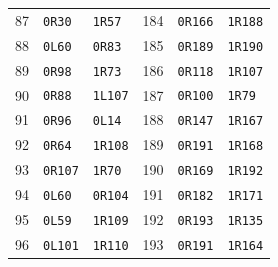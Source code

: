 \begin{longtable}{@{}rll@{\hspace{2em}}rll@{}}
87 & \texttt{0R30} & \texttt{1R57} & 184 & \texttt{0R166} & \texttt{1R188}\\
88 & \texttt{0L60} & \texttt{0R83} & 185 & \texttt{0R189} & \texttt{1R190}\\
89 & \texttt{0R98} & \texttt{1R73} & 186 & \texttt{0R118} & \texttt{1R107}\\
90 & \texttt{0R88} & \texttt{1L107} & 187 & \texttt{0R100} & \texttt{1R79}\\
91 & \texttt{0R96} & \texttt{0L14} & 188 & \texttt{0R147} & \texttt{1R167}\\
92 & \texttt{0R64} & \texttt{1R108} & 189 & \texttt{0R191} & \texttt{1R168}\\
93 & \texttt{0R107} & \texttt{1R70} & 190 & \texttt{0R169} & \texttt{1R192}\\
94 & \texttt{0L60} & \texttt{0R104} & 191 & \texttt{0R182} & \texttt{1R171}\\
95 & \texttt{0L59} & \texttt{1R109} & 192 & \texttt{0R193} & \texttt{1R135}\\
96 & \texttt{0L101} & \texttt{1R110} & 193 & \texttt{0R191} & \texttt{1R164}\\
\bottomrule
\end{longtable}
\endgroup
